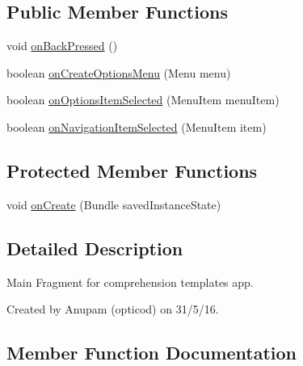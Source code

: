 \subsection*{Public Member Functions}
\begin{DoxyCompactItemize}
\item 
void \hyperlink{classorg_1_1buildmlearn_1_1comprehension_1_1activities_1_1MainActivity_ae86e7b7c65f447e7489badb3e35e0430}{on\+Back\+Pressed} ()
\item 
boolean \hyperlink{classorg_1_1buildmlearn_1_1comprehension_1_1activities_1_1MainActivity_aaf40d79ebf89b976cf302d6617a47d3c}{on\+Create\+Options\+Menu} (Menu menu)
\item 
boolean \hyperlink{classorg_1_1buildmlearn_1_1comprehension_1_1activities_1_1MainActivity_a07368015191f57ba807598a552abfb67}{on\+Options\+Item\+Selected} (Menu\+Item menu\+Item)
\item 
boolean \hyperlink{classorg_1_1buildmlearn_1_1comprehension_1_1activities_1_1MainActivity_a8eae6acf6ae055e6c9ec8cb233ea939f}{on\+Navigation\+Item\+Selected} (Menu\+Item item)
\end{DoxyCompactItemize}
\subsection*{Protected Member Functions}
\begin{DoxyCompactItemize}
\item 
void \hyperlink{classorg_1_1buildmlearn_1_1comprehension_1_1activities_1_1MainActivity_a7facacf794874d243c0b9e0aa0e1d97c}{on\+Create} (Bundle saved\+Instance\+State)
\end{DoxyCompactItemize}


\subsection{Detailed Description}
Main Fragment for comprehension template\textquotesingle{}s app. 

Created by Anupam (opticod) on 31/5/16. 

\subsection{Member Function Documentation}
